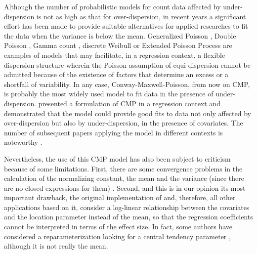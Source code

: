 Although the number of probabilistic models for count data affected by under-dispersion is not as high as that for over-dispersion, in recent years a significant effort has been made to provide suitable alternatives for applied researches to fit the data when the variance is below the mean. Generalized Poisson \citep{Consul92,Wang97, Famoye04, Zamani12, Grover15, sellers17}, Double Poisson \citep{Efron86, Zou13, sellers17}, Gamma count \citep{winkelmann95, Oh06, Lord10, daniels10, daniels11, Zeviani14, sellers17}, discrete Weibull \citep{McShane08, Ong15, klakattawi18, Yoo19} or Extended Poisson Process \citep{faddy11, smith16} are examples of models that may facilitate, in a regression context, a flexible dispersion structure wherein the Poisson assumption of equi-dispersion cannot be admitted because of the existence of factors that determine an excess or a shortfall of variability. In any case, Conway-Maxwell-Poisson, from now on CMP, is probably the most widely used model to fit data in the presence of under-dispersion. \citet{sellers10} presented a formulation of CMP in a regression context and demonstrated that the model could provide good fits to data not only affected by over-dispersion but also by under-dispersion, in the presence of covariates. The number of subsequent papers applying the model in different contexts is noteworthy \citep{sellers12, sellers17, CHATLA18, ABDELLA19}.

Nevertheless, the use of this CMP model has also been subject to criticism because of some limitations. First, there are some convergence problems in the calculation of the normalizing constant, the mean and the variance (since there are no closed expressions for them) \citep{francis12}. Second, and this is in our opinion its most important drawback, the original implementation of \citet{sellers10} and, therefore, all other applications based on it, consider a log-linear relationship between the covariates and the location parameter instead of the mean, so that the regression coefficients cannot be interpreted in terms of the effect size. In fact, some authors have considered a reparameterization looking for a central tendency parameter \citep{Guikema08, Lord10, francis12, Chanialidis2018}, although it is not really the mean.

